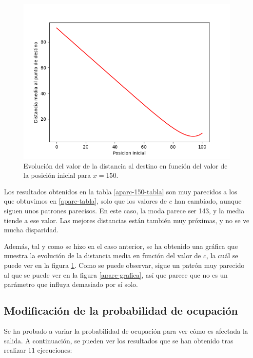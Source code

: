 \documentclass[11pt,a4paper]{report}
\begin{document}
\begin{figure}[H]
\centering
\includegraphics[scale=0.47]{img/c-dist.png}
\caption{Evolución del valor de la distancia al destino en función del valor de la posición inicial para $x = 150$.}
\label{aparc-150-grafica}
\end{figure}

Los resultados obtenidos en la tabla \ref{aparc-150-tabla} son muy parecidos a los que obtuvimos en \ref{aparc-tabla},
solo que los valores de $c$ han cambiado, aunque siguen unos patrones parecisos. En este caso, la moda parece ser 143,
y la media tiende a ese valor. Las mejores distancias están también muy próximas, y no se ve mucha disparidad.

Además, tal y como se hizo en el caso anterior, se ha obtenido una gráfica que muestra la evolución de la distancia media
en función del valor de $c$, la cuál se puede ver en la figura \ref{aparc-150-grafica}. Como se puede observar, sigue
un patrón muy parecido al que se puede ver en la figura \ref{aparc-grafica}, así que parece que no es un parámetro
que influya demasiado por sí solo.

\subsection{Modificación de la probabilidad de ocupación}

Se ha probado a variar la probabilidad de ocupación para ver cómo es afectada la salida. A continuación, se pueden ver
los resultados que se han obtenido tras realizar 11 ejecuciones:
\end{document}
